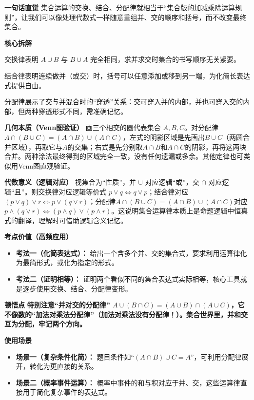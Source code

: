 \begin{explanationbox}
	\textbf{\textcolor{CExplanation}{一句话直觉}}
	集合运算的交换、结合、分配律就相当于“集合版的加减乘除运算规则”，让我们可以像处理代数式一样随意重组并、交的顺序和括号，而不改变最终集合。

	\medskip
	\textbf{\textcolor{CExplanation}{核心拆解}}
	\begin{description}[style=nextline, leftmargin=2.8em, labelsep=0.5em, itemsep=0.45em]
		\item[\textbf{要点一（顺序无关）：}]
			交换律表明 $A\cup B$ 与 $B\cup A$ 完全相同，求并求交时集合的书写顺序无关紧要。
		\item[\textbf{要点二（括号可移）：}]
			结合律表明连续做并（或交）时，括号可以任意添加或移到另一端，为化简长表达式提供自由。
		\item[\textbf{要点三（交叉穿透）：}]
			分配律展示了交与并混合时的“穿透”关系：交可穿入并的内部，并也可穿入交的内部，但两种穿透形式不同，需准确记忆。
	\end{description}

	\medskip
	\textbf{\textcolor{CExplanation}{几何本质（Venn图验证）}}
	画三个相交的圆代表集合 $A,B,C$。对分配律$A\cap(B\cup C)=(A\cap B)\cup(A\cap C)$，左式的阴影区域是先画出$B\cup C$（两圆合并区域），再取它与$A$的交集；右式是先分别取$A\cap B$和$A\cap C$的阴影，再将这两块合并。两种涂法最终得到的区域完全一致，没有任何遗漏或多余。其他定律也可类似用Venn图直观验证。

	\medskip
	\textbf{\textcolor{CExplanation}{代数意义（逻辑对应）}}
	视集合为“性质”，并 $\cup$ 对应逻辑“或”，交 $\cap$ 对应逻辑“且”。则交换律对应逻辑等价式 $p\lor q\iff q\lor p$；结合律对应 $(p\lor q)\lor r\iff p\lor(q\lor r)$；分配律$A\cap(B\cup C)=(A\cap B)\cup(A\cap C)$对应 $p\land(q\lor r)\iff(p\land q)\lor(p\land r)$。这说明集合运算律本质上是命题逻辑中恒真式的翻译，理解时可借助逻辑含义记忆。

	\medskip
	\textbf{\textcolor{CExplanation}{考点价值（高频应用）}}
	\begin{itemize}[leftmargin=*, itemsep=0.5em, topsep=0.4em]
		\item \textbf{考法一（化简表达式）：} 给出一个含多个并、交的集合式，要求利用运算律化为最简形式，或化为指定的形式。
		\item \textbf{考法二（证明相等）：} 证明两个看似不同的集合表达式实际相等，核心工具就是逐步使用交换、结合、分配律变形。
	\end{itemize}

	\medskip
	\textbf{\textcolor{CExplanation}{顿悟点}}
	\textbf{特别注意“并对交的分配律” $A\cup(B\cap C)=(A\cup B)\cap(A\cup C)$，它不像数的“加法对乘法分配律”（加法对乘法没有分配律！）。集合世界里，并和交互为分配，牢记两个方向。}

	\medskip
	\textbf{\textcolor{CExplanation}{使用场景}}
	\begin{itemize}[leftmargin=*, itemsep=0.5em, topsep=0.4em]
		\item \textbf{场景一（复杂条件化简）：} 题目条件如“$(A\cap B)\cup C = A$”，可利用分配律展开，转化为更直接的关系。
		\item \textbf{场景二（概率事件运算）：} 概率中事件的和与积对应于并、交，这些运算律直接用于简化复杂事件的表达式。
	\end{itemize}

\end{explanationbox}
